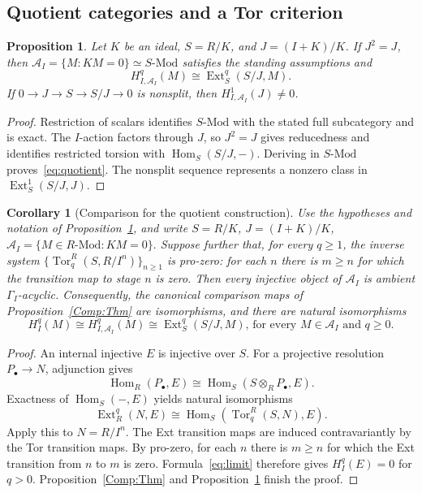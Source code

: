\documentclass[11pt,reqno]{amsart}
\newtheorem{proposition}[theorem]{Proposition}
\newtheorem{corollary}[theorem]{Corollary}
\theoremstyle{definition}
\theoremstyle{remark}
\newcommand{\Mod}{\text{-}\mathrm{Mod}}
\newcommand{\Hom}{\operatorname{Hom}}
\newcommand{\Ext}{\operatorname{Ext}}
\newcommand{\Tor}{\operatorname{Tor}}
\newcommand{\A}{\mathcal A_I}
\begin{document}
\subsection{Quotient categories and a Tor criterion}
\begin{proposition}\label{thm:main}
Let $K$ be an ideal, $S=R/K$, and $J=(I+K)/K$. If $J^2=J$, then $\A=\{M:KM=0\}\simeq S\Mod$ satisfies the standing assumptions and
\begin{equation}\label{eq:quotient}
H_{I,\A}^q(M)\cong\Ext_S^q(S/J,M).
\end{equation}
If $0\to J\to S\to S/J\to0$ is nonsplit, then $H_{I,\A}^1(J)\ne0$.
\end{proposition}
\begin{proof}
Restriction of scalars identifies $S\Mod$ with the stated full subcategory and is exact. The $I$-action factors through $J$, so $J^2=J$ gives reducedness and identifies restricted torsion with $\Hom_S(S/J,-)$. Deriving in $S\Mod$ proves~\eqref{eq:quotient}. The nonsplit sequence represents a nonzero class in $\Ext_S^1(S/J,J)$.
\end{proof}
\begin{corollary}[Comparison for the quotient construction]
\label{cor:quotient-comparison}
Use the hypotheses and notation of Proposition~\ref{thm:main}, and
write
\(S=R/K\), \(J=(I+K)/K\), \(\mathcal A_I
=\{M\in R\text{-}\mathrm{Mod}:KM=0\}.\) Suppose further that, for every $q\geq1$,
the inverse system \(\{\operatorname{Tor}_q^R(S,R/I^n)\}_{n\geq1}\)
is pro-zero: for each $n$ there is $m\geq n$ for which the transition map to stage $n$ is zero.
Then every injective object of $\mathcal A_I$
is ambient $\Gamma_I$-acyclic. Consequently,
the canonical comparison maps of
Proposition~\ref{Comp:Thm} are isomorphisms,
and there are natural isomorphisms
\[
H_I^q(M)
\cong H_{I,\mathcal A_I}^q(M)
\cong \operatorname{Ext}_S^q(S/J,M)\text{, for every  }M\in\mathcal A_I \text{ and } q\geq0.\]
\end{corollary}

\begin{proof}
An internal injective $E$ is injective over $S$. For a projective resolution $P_\bullet\to N$, adjunction gives
\[
\Hom_R(P_\bullet,E)\cong\Hom_S(S\otimes_RP_\bullet,E).
\]
Exactness of $\Hom_S(-,E)$ yields natural isomorphisms
\[
\Ext_R^q(N,E)\cong\Hom_S(\Tor_q^R(S,N),E).
\]
Apply this to $N=R/I^n$. The Ext transition maps are induced contravariantly by the Tor transition maps. By pro-zero, for each $n$ there is $m\geq n$ for which the Ext transition from $n$ to $m$ is zero. Formula~\eqref{eq:limit} therefore gives $H_I^q(E)=0$ for $q>0$. Proposition~\ref{Comp:Thm} and Proposition~\ref{thm:main} finish the proof.
\end{proof}
\end{document}
